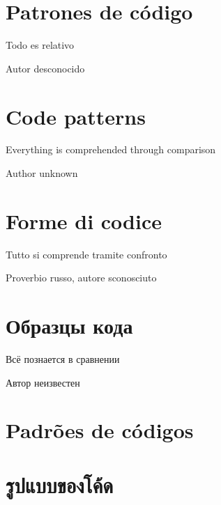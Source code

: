 \ifdefined\SPANISH
\part{Patrones de código}

\epigraph{Todo es relativo}{Autor desconocido}
\fi %

\ifdefined\ENGLISH
\part{Code patterns}

\epigraph{Everything is comprehended through comparison}{Author unknown}
\fi %

\ifdefined\ITALIAN
\part{Forme di codice}

\epigraph{Tutto si comprende tramite confronto}{Proverbio russo, autore sconosciuto}
\fi %

\ifdefined\RUSSIAN
\part{Образцы кода}
\epigraph{Всё познается в сравнении}{Автор неизвестен}
\fi %

\ifdefined\BRAZILIAN
\part{Padrões de códigos}
\fi %

\ifdefined\THAI
\part{รูปแบบของโค้ด}
\fi %

\EN{}
\ES{}
\ITA{}
\PTBR{}
\RU{}
\THA{}

